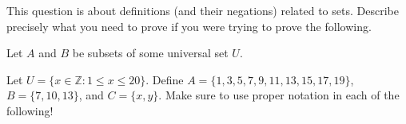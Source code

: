 \documentclass[11pt,answers]{exam}
\newcommand{\Z}{\mathbb{Z}}
\begin{document}
\begin{questions}


\question This question is about definitions (and their negations) related to sets.  Describe precisely what you need to prove if you were trying to prove the following.

Let $A$ and $B$ be subsets of some universal set $U$.


\question Let $U = \{x\in\Z : 1\leq x \leq 20\}$. Define $A = \{1,3,5,7,9,11,13,15,17,19\}$, $B = \{7,10,13\}$, and $C = \{x,y\}$. Make sure to use proper notation in each of the following!


\end{questions}
\newpage
\end{document}
